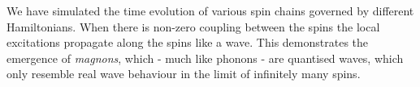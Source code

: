 We have simulated the time evolution of various spin chains governed by different Hamiltonians. When there is non-zero coupling between the spins the local excitations propagate along the spins like a wave. This demonstrates the emergence of \textit{magnons}, which - much like phonons - are quantised waves, which only resemble real wave behaviour in the limit of infinitely many spins.